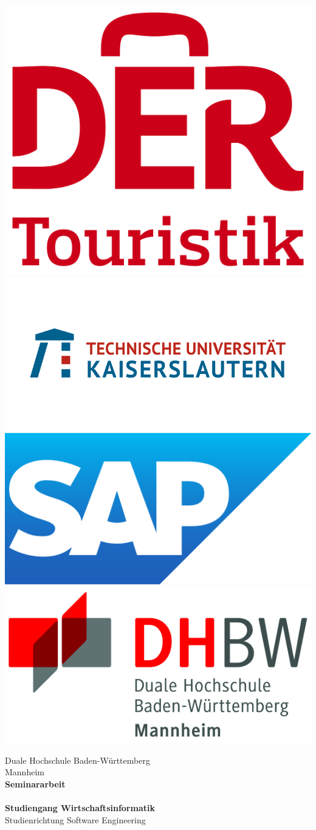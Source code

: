 \begin{titlepage}

\begin{minipage}{\textwidth}
	\vspace{-2cm}
	\noindent
	\includegraphics[height=0.1\linewidth]{img/logos/der}
	\hfill
	\includegraphics[height=0.1\linewidth]{img/logos/tukl}
	\hfill
	\includegraphics[height=0.1\linewidth]{img/logos/sap}
	\hfill
	\includegraphics[height=0.1\linewidth]{img/logos/dhbw}
\end{minipage}

\vspace{1em}
\sffamily

\begin{center}
	\textsf{\large{}Duale Hochschule Baden-Württemberg\\[1.5mm] Mannheim}\\[2em]
	\textsf{\textbf{\Large{}Seminararbeit}}\\[3mm]
	\textsf{\textbf{\DerTitelDerArbeit}}\\[1.5cm]
	\textsf{\textbf{\Large{}Studiengang Wirtschaftsinformatik}\\[3mm] \textsf{Studienrichtung Software Engineering}}
	
	\vspace{3em}
	\vfill

	\begin{minipage}{\textwidth}
	

\end{minipage}
\end{center}
\end{titlepage}
